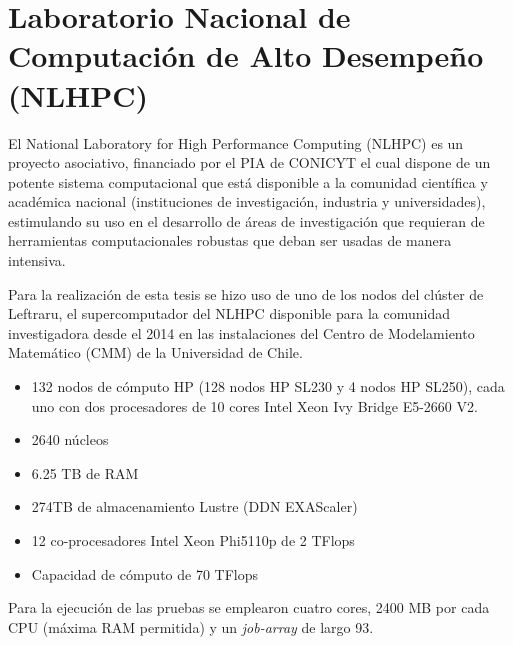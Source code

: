 \section{Laboratorio Nacional de Computaci\'on de Alto Desempe\~no (NLHPC)}
El National Laboratory for High Performance Computing (NLHPC) es un proyecto asociativo, financiado por el PIA de CONICYT el cual dispone de un potente sistema computacional que est\'a disponible a la comunidad cient\'ifica y acad\'emica nacional (instituciones de investigaci\'on, industria y universidades), estimulando su uso en el desarrollo de \'areas de investigaci\'on que requieran de herramientas computacionales robustas que deban ser usadas de manera intensiva. 
\bigskip

Para la realizaci\'on de esta tesis se hizo uso de uno de los nodos del cl\'uster de Leftraru, el supercomputador del NLHPC disponible para la comunidad investigadora desde el 2014 en las instalaciones del Centro de Modelamiento Matem\'atico (CMM) de la Universidad de Chile.  

\begin{itemize}
\item 132 nodos de c\'omputo HP (128 nodos HP SL230 y 4 nodos HP SL250), cada uno con dos procesadores de 10 cores Intel Xeon Ivy Bridge E5-2660 V2.
\item 2640 n\'ucleos
\item 6.25 TB de RAM
\item 274TB de almacenamiento Lustre (DDN EXAScaler)
\item 12 co-procesadores Intel Xeon Phi5110p de 2 TFlops
\item Capacidad de c\'omputo de 70 TFlops 
\end{itemize} 

Para la ejecuci\'on de las pruebas se emplearon cuatro cores, 2400 MB por cada CPU (m\'axima RAM permitida) y un \textit{job-array} de largo 93.

